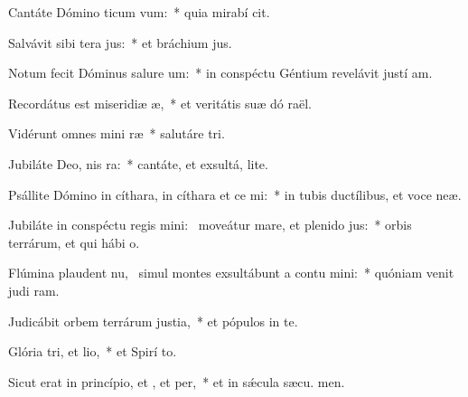 \item Cantáte Dómino ticum vum:~* quia mirabí cit.
\item Salvávit sibi tera jus:~* et bráchium  jus.
\item Notum fecit Dóminus salure um:~* in conspéctu Géntium revelávit justí am.
\item Recordátus est miseridiæ æ,~* et veritátis suæ dó raël.
\item Vidérunt omnes mini ræ~* salutáre  tri.
\item Jubiláte Deo, nis ra:~* cantáte, et exsultá,  lite.
\item Psállite Dómino in cíthara, in cíthara et ce mi:~* in tubis ductílibus, et voce  neæ.
\item Jubiláte in conspéctu regis mini:~\pscross{} moveátur mare, et plenido jus:~* orbis terrárum, et qui hábi  o.
\item Flúmina plaudent nu,~\pscross{} simul montes exsultábunt a contu mini:~* quóniam venit judi ram.
\item Judicábit orbem terrárum  justia,~* et pópulos in te.
\item Glória tri, et lio,~* et Spirí to.
\item Sicut erat in princípio, et , et per,~* et in sǽcula sæcu. men.
